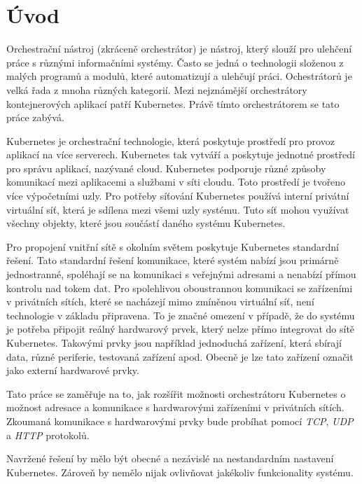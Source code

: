 \chapter*{Úvod}
\setcounter{page}{1}

Orchestrační nástroj (zkráceně orchestrátor) je nástroj, který slouží pro ulehčení práce s různými informačními systémy. Často se jedná o technologii složenou z malých programů a modulů, které automatizují a ulehčují práci. Ochestrátorů je velká řada z mnoha různých kategorií. Mezi nejznámější orchestrátory kontejnerových aplikací patří Kubernetes. Právě tímto orchestrátorem se tato práce zabývá. \cite{goldberg_2019_workflow}

Kubernetes je orchestrační technologie, která poskytuje prostředí pro provoz aplikací na více serverech. Kubernetes tak vytváří a poskytuje jednotné prostředí pro správu aplikací, nazývané cloud. Kubernetes podporuje různé způsoby komunikací mezi aplikacemi a službami v síti cloudu. Toto prostředí je tvořeno více výpočetními uzly. Pro potřeby síťování Kubernetes používá interní privátní virtuální síť, která je sdílena mezi všemi uzly systému. Tuto síť mohou využívat všechny objekty, které jsou součástí daného systému Kubernetes.

Pro propojení vnitřní sítě s okolním světem poskytuje Kubernetes standardní řešení. Tato standardní řešení komunikace, které systém nabízí jsou primárně jednostranné, spoléhají se na komunikaci s veřejnými adresami a nenabízí přímou kontrolu nad tokem dat. Pro spolehlivou oboustrannou komunikaci se zařízeními v privátních sítích, které se nacházejí mimo zmíněnou virtuální síť, není technologie v základu připravena. To je značné omezení v případě, že do systému je potřeba připojit reálný hardwarový prvek, který nelze přímo integrovat do sítě Kubernetes. Takovými prvky jsou například jednoduchá zařízení, která sbírají data, různé periferie, testovaná zařízení apod. Obecně je lze tato zařízení označit jako externí hardwarové prvky.

Tato práce se zaměřuje na to, jak rozšířit možnosti orchestrátoru Kubernetes o možnost adresace a komunikace s hardwarovými zařízeními v privátních sítích. Zkoumaná komunikace s hardwarovými prvky bude probíhat pomocí \textit{TCP}, \textit{UDP} a \textit{HTTP} protokolů.

Navržené řešení by mělo být obecné a nezávislé na nestandardním nastavení Kubernetes. Zároveň by nemělo nijak ovlivňovat jakékoliv funkcionality systému. 

